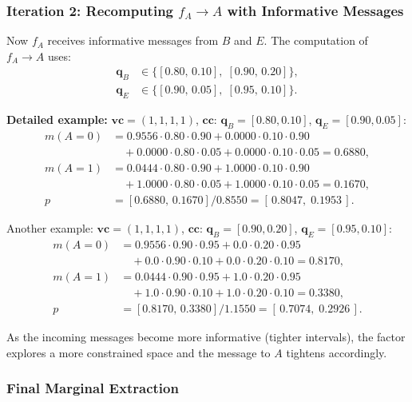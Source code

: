 \documentclass[11pt]{article}
\begin{document}
\subsubsection{Iteration 2: Recomputing $f_A \to A$ with Informative Messages}

Now $f_A$ receives informative messages from $B$ and $E$. The computation of
$f_A \to A$ uses:
\begin{align*}
  \mathbf{q}_B &\in \{[0.80,\, 0.10],\; [0.90,\, 0.20]\}, \\
  \mathbf{q}_E &\in \{[0.90,\, 0.05],\; [0.95,\, 0.10]\}.
\end{align*}

\textbf{Detailed example:} $\mathbf{vc} = (1,1,1,1)$, $\mathbf{cc}$: $\mathbf{q}_B = [0.80, 0.10]$,
$\mathbf{q}_E = [0.90, 0.05]$:
\begin{align*}
  m(A{=}0) &= 0.9556 \cdot 0.80 \cdot 0.90 + 0.0000 \cdot 0.10 \cdot 0.90 \\
            &\quad + 0.0000 \cdot 0.80 \cdot 0.05 + 0.0000 \cdot 0.10 \cdot 0.05 = 0.6880, \\
  m(A{=}1) &= 0.0444 \cdot 0.80 \cdot 0.90 + 1.0000 \cdot 0.10 \cdot 0.90 \\
            &\quad + 1.0000 \cdot 0.80 \cdot 0.05 + 1.0000 \cdot 0.10 \cdot 0.05 = 0.1670, \\
  p &= [0.6880,\, 0.1670] / 0.8550 = [\,0.8047,\; 0.1953\,].
\end{align*}

Another example: $\mathbf{vc} = (1,1,1,1)$, $\mathbf{cc}$: $\mathbf{q}_B = [0.90, 0.20]$,
$\mathbf{q}_E = [0.95, 0.10]$:
\begin{align*}
  m(A{=}0) &= 0.9556 \cdot 0.90 \cdot 0.95 + 0.0 \cdot 0.20 \cdot 0.95 \\
            &\quad + 0.0 \cdot 0.90 \cdot 0.10 + 0.0 \cdot 0.20 \cdot 0.10 = 0.8170, \\
  m(A{=}1) &= 0.0444 \cdot 0.90 \cdot 0.95 + 1.0 \cdot 0.20 \cdot 0.95 \\
            &\quad + 1.0 \cdot 0.90 \cdot 0.10 + 1.0 \cdot 0.20 \cdot 0.10 = 0.3380, \\
  p &= [0.8170,\, 0.3380] / 1.1550 = [\,0.7074,\; 0.2926\,].
\end{align*}

As the incoming messages become more informative (tighter intervals), the factor
explores a more constrained space and the message to $A$ tightens accordingly.

\subsubsection{Final Marginal Extraction}
\end{document}
